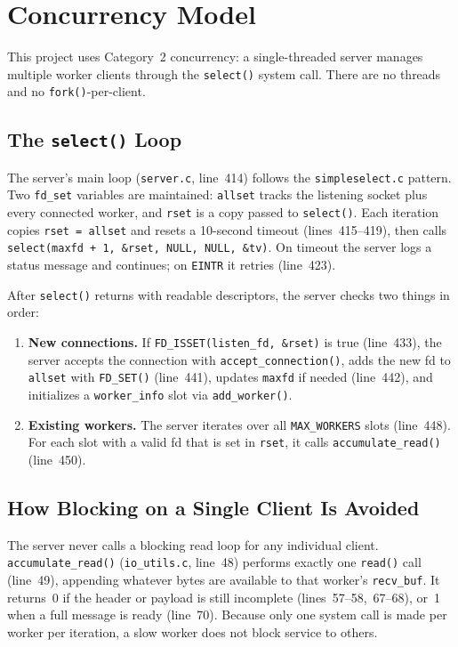 \documentclass[11pt]{article}
\begin{document}
\section{Concurrency Model}
\label{sec:concurrency}

This project uses Category~2 concurrency: a single-threaded server manages
multiple worker clients through the \texttt{select()} system call. There are no
threads and no \texttt{fork()}-per-client.

\subsection{The \texttt{select()} Loop}

The server's main loop (\texttt{server.c}, line~414) follows the
\texttt{simpleselect.c} pattern. Two \texttt{fd\_set} variables are maintained:
\texttt{allset} tracks the listening socket plus every connected worker, and
\texttt{rset} is a copy passed to \texttt{select()}. Each iteration copies
\texttt{rset = allset} and resets a 10-second timeout (lines~415--419), then
calls \texttt{select(maxfd + 1, \&rset, NULL, NULL, \&tv)}. On timeout the
server logs a status message and continues; on \texttt{EINTR} it retries
(line~423).

After \texttt{select()} returns with readable descriptors, the server checks two
things in order:

\begin{enumerate}
  \item \textbf{New connections.} If \texttt{FD\_ISSET(listen\_fd, \&rset)} is
    true (line~433), the server accepts the connection with
    \texttt{accept\_connection()}, adds the new fd to \texttt{allset} with
    \texttt{FD\_SET()} (line~441), updates \texttt{maxfd} if needed (line~442),
    and initializes a \texttt{worker\_info} slot via \texttt{add\_worker()}.

  \item \textbf{Existing workers.} The server iterates over all
    \texttt{MAX\_WORKERS} slots (line~448). For each slot with a valid fd that
    is set in \texttt{rset}, it calls \texttt{accumulate\_read()} (line~450).
\end{enumerate}

\subsection{How Blocking on a Single Client Is Avoided}

The server never calls a blocking read loop for any individual client.
\texttt{accumulate\_read()} (\texttt{io\_utils.c}, line~48) performs exactly one
\texttt{read()} call (line~49), appending whatever bytes are available to that
worker's \texttt{recv\_buf}. It returns~0 if the header or payload is still
incomplete (lines~57--58,~67--68), or~1 when a full message is ready (line~70). Because
only one system call is made per worker per iteration, a slow worker does not
block service to others.
\end{document}
